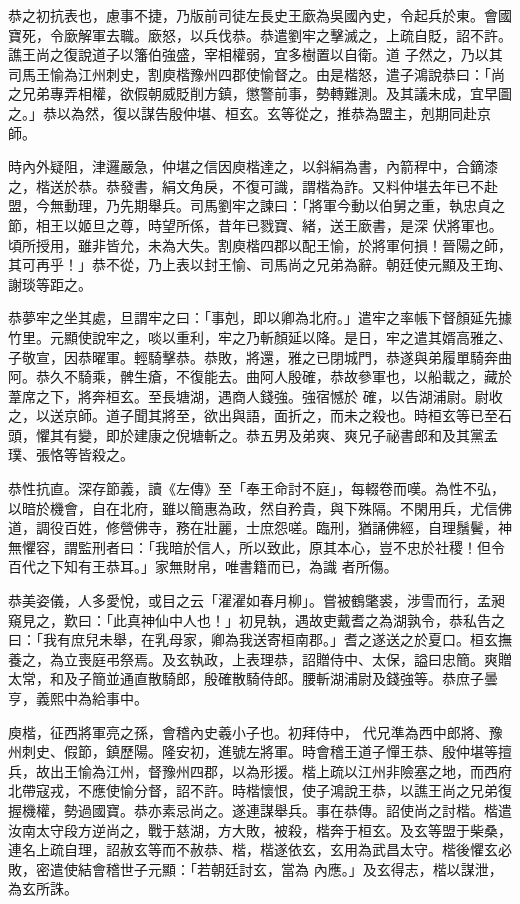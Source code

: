 \begin{pinyinscope}
 恭之初抗表也，慮事不捷，乃版前司徒左長史王廞為吳國內史，令起兵於東。會國寶死，令廞解軍去職。廞怒，以兵伐恭。恭遣劉牢之擊滅之，上疏自貶，詔不許。譙王尚之復說道子以籓伯強盛，宰相權弱，宜多樹置以自衛。道
 子然之，乃以其司馬王愉為江州刺史，割庾楷豫州四郡使愉督之。由是楷怒，遣子鴻說恭曰：「尚之兄弟專弄相權，欲假朝威貶削方鎮，懲警前事，勢轉難測。及其議未成，宜早圖之。」恭以為然，復以謀告殷仲堪、桓玄。玄等從之，推恭為盟主，剋期同赴京師。



 時內外疑阻，津邏嚴急，仲堪之信因庾楷達之，以斜絹為書，內箭稈中，合鏑漆之，楷送於恭。恭發書，絹文角戾，不復可識，謂楷為詐。又料仲堪去年已不赴盟，今無動理，乃先期舉兵。司馬劉牢之諫曰：「將軍今動以伯舅之重，執忠貞之節，相王以姬旦之尊，時望所係，昔年已戮寶、緒，送王廞書，是深
 伏將軍也。頃所授用，雖非皆允，未為大失。割庾楷四郡以配王愉，於將軍何損！晉陽之師，其可再乎！」恭不從，乃上表以封王愉、司馬尚之兄弟為辭。朝廷使元顯及王珣、謝琰等距之。



 恭夢牢之坐其處，旦謂牢之曰：「事剋，即以卿為北府。」遣牢之率帳下督顏延先據竹里。元顯使說牢之，啖以重利，牢之乃斬顏延以降。是日，牢之遣其婿高雅之、子敬宣，因恭曜軍。輕騎擊恭。恭敗，將還，雅之已閉城門，恭遂與弟履單騎奔曲阿。恭久不騎乘，髀生瘡，不復能去。曲阿人殷確，恭故參軍也，以船載之，藏於葦席之下，將奔桓玄。至長塘湖，遇商人錢強。強宿憾於
 確，以告湖浦尉。尉收之，以送京師。道子聞其將至，欲出與語，面折之，而未之殺也。時桓玄等已至石頭，懼其有變，即於建康之倪塘斬之。恭五男及弟爽、爽兄子祕書郎和及其黨孟璞、張恪等皆殺之。



 恭性抗直。深存節義，讀《左傳》至「奉王命討不庭」，每輟卷而嘆。為性不弘，以暗於機會，自在北府，雖以簡惠為政，然自矜貴，與下殊隔。不閑用兵，尤信佛道，調役百姓，修營佛寺，務在壯麗，士庶怨嗟。臨刑，猶誦佛經，自理鬚鬢，神無懼容，謂監刑者曰：「我暗於信人，所以致此，原其本心，豈不忠於社稷！但令百代之下知有王恭耳。」家無財帛，唯書籍而已，為識
 者所傷。



 恭美姿儀，人多愛悅，或目之云「濯濯如春月柳」。嘗被鶴氅裘，涉雪而行，孟昶窺見之，歎曰：「此真神仙中人也！」初見執，遇故吏戴耆之為湖孰令，恭私告之曰：「我有庶兒未舉，在乳母家，卿為我送寄桓南郡。」耆之遂送之於夏口。桓玄撫養之，為立喪庭弔祭焉。及玄執政，上表理恭，詔贈侍中、太保，謚曰忠簡。爽贈太常，和及子簡並通直散騎郎，殷確散騎侍郎。腰斬湖浦尉及錢強等。恭庶子曇亨，義熙中為給事中。



 庾楷，征西將軍亮之孫，會稽內史羲小子也。初拜侍中，
 代兄準為西中郎將、豫州刺史、假節，鎮歷陽。隆安初，進號左將軍。時會稽王道子憚王恭、殷仲堪等擅兵，故出王愉為江州，督豫州四郡，以為形援。楷上疏以江州非險塞之地，而西府北帶寇戎，不應使愉分督，詔不許。時楷懷恨，使子鴻說王恭，以譙王尚之兄弟復握機權，勢過國寶。恭亦素忌尚之。遂連謀舉兵。事在恭傳。詔使尚之討楷。楷遣汝南太守段方逆尚之，戰于慈湖，方大敗，被殺，楷奔于桓玄。及玄等盟于柴桑，連名上疏自理，詔赦玄等而不赦恭、楷，楷遂依玄，玄用為武昌太守。楷後懼玄必敗，密遣使結會稽世子元顯：「若朝廷討玄，當為
 內應。」及玄得志，楷以謀泄，為玄所誅。




\end{pinyinscope}
